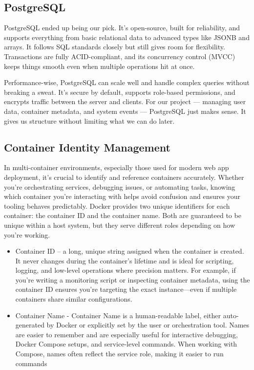 \documentclass[12pt,titlepage]{article}
\begin{document}
\subsection{PostgreSQL}
PostgreSQL ended up being our pick. It’s open-source, built for reliability, and supports everything from basic relational data to advanced types like JSONB and arrays. It follows SQL standards closely but still gives room for flexibility. Transactions are fully ACID-compliant, and its concurrency control (MVCC) keeps things smooth even when multiple operations hit at once.

Performance-wise, PostgreSQL can scale well and handle complex queries without breaking a sweat. It’s secure by default, supports role-based permissions, and encrypts traffic between the server and clients. For our project — managing user data, container metadata, and system events — PostgreSQL just makes sense. It gives us structure without limiting what we can do later.


\subsection{Container Identity Management} \label{subsec:container-identity-management}
In multi-container environments, especially those used for modern web app deployment, it's crucial to identify and reference containers accurately. Whether you're orchestrating services, debugging issues, or automating tasks, knowing which container you're interacting with helps avoid confusion and ensures your tooling behaves predictably.
Docker provides two unique identifiers for each container: the container ID and the container name. Both are guaranteed to be unique within a host system, but they serve different roles depending on how you're working.

\begin{itemize}
    \item{Container ID} – a long, unique string  assigned when the container is created. It never changes during the container’s lifetime and is ideal for scripting, logging, and low-level operations where precision matters. For example, if you're writing a monitoring script or inspecting container metadata, using the container ID ensures you're targeting the exact instance—even if multiple containers share similar configurations.

	\item{Container Name} - Container Name is a human-readable label, either auto-generated by Docker or explicitly set by the user or orchestration tool. Names are easier to remember and are especially useful for interactive debugging, Docker Compose setups, and service-level commands. When working with Compose, names often reflect the service role, making it easier to run commands 
\end{itemize}
\end{document}
